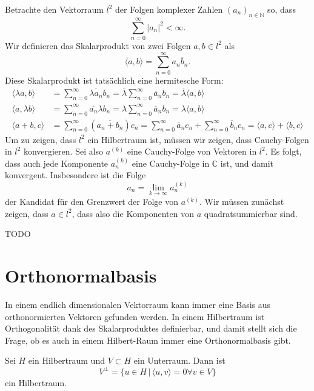 \begin{beispiel}
Betrachte den Vektorraum $l^2$ der Folgen komplexer Zahlen
$(a_n)_{n\in\mathbb N}$ so, dass 
\[
\sum_{n=0}^\infty |a_n|^2 <\infty.
\]
Wir definieren das Skalarprodukt von zwei Folgen $a,b\in l^2$ als
\[
\langle a,b\rangle
=
\sum_{n=0}^\infty a_n \overline b_n.
\]
Diese Skalarprodukt ist tatsächlich eine hermitesche Form:
\begin{align*}
\langle \lambda a,b\rangle
&=
\sum_{n=0}^\infty \overline{\lambda a_n} b_n
=
\overline\lambda\sum_{n=0}^\infty \overline a_nb_n
=
\overline\lambda \langle a,b\rangle
\\
\langle a,\lambda b\rangle
&=
\sum_{n=0}^\infty \overline{a_n} \lambda b_n
=
\lambda\sum_{n=0}^\infty \overline a_nb_n
=
\lambda \langle a,b\rangle
\\
\langle a+b,c\rangle
&=
\sum_{n=0}^\infty (\overline{a_n+b_n})c_n
=
\sum_{n=0}^\infty \overline a_n c_n + \sum_{n=0}^\infty \overline b_n c_n
=
\langle a,c\rangle + \langle b,c\rangle
\end{align*}
Um zu zeigen, dass $l^2$ ein Hilbertraum ist, müssen wir zeigen, dass 
Cauchy-Folgen in $l^2$ konvergieren.
Sei also $a^(k)$  eine Cauchy-Folge von Vektoren in $l^2$.
Es folgt, dass auch jede Komponente $a^{(k)}_n$ eine Cauchy-Folge in
$\mathbb C$ ist, und damit konvergent.
Insbesondere ist die Folge
\[
a_n = \lim_{k\to\infty} a_n^{(k)}
\]
der Kandidat für den Grenzwert der Folge von $a^{(k)}$.
Wir müssen zunächst zeigen, dass $a\in l^2$, dass also die
Komponenten von $a$ quadratsummierbar sind.

TODO
\end{beispiel}

\section{Orthonormalbasis}
In einem endlich dimensionalen Vektorraum kann immer eine Basis aus
orthonormierten Vektoren gefunden werden.
In einem Hilbertraum ist Orthogonalität dank des Skalarproduktes definierbar,
und damit stellt sich die Frage, ob es auch in einem Hilbert-Raum
immer eine Orthonormalbasis gibt.

\begin{proposition}
\label{supplement:hilbertraum:orthogonalkomplement}
Sei $H$ ein Hilbertraum und $V\subset H$ ein Unterraum.
Dann ist
\[
V^\perp = \{u\in H\,|\, \langle u,v\rangle=0\forall v\in V\}
\]
ein Hilbertraum.
\end{proposition}

